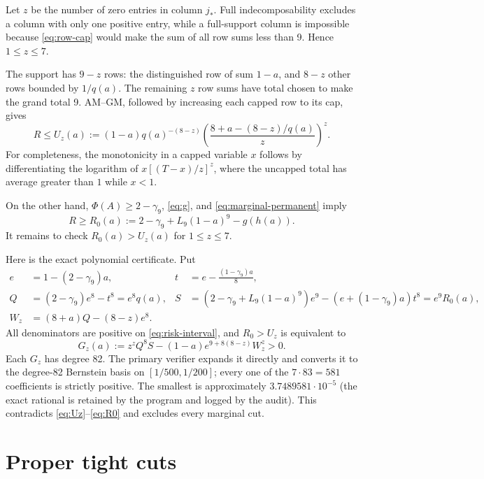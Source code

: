 \documentclass[11pt]{article}
\theoremstyle{remark}
\begin{document}
Let $z$ be the number of zero entries in column $j_*$.  Full
indecomposability excludes a column with only one positive entry, while a
full-support column is impossible because \eqref{eq:row-cap} would make the
sum of all row sums less than 9.  Hence $1\le z\le7$.

The support has $9-z$ rows: the distinguished row of sum $1-a$, and
$8-z$ other rows bounded by $1/q(a)$.  The remaining $z$ row sums have total
chosen to make the grand total 9.  AM--GM, followed by increasing each capped
row to its cap, gives
\begin{equation}\label{eq:Uz}
 R\le U_z(a):=(1-a)q(a)^{-(8-z)}
 \left(\frac{8+a-(8-z)/q(a)}{z}\right)^z.
\end{equation}
For completeness, the monotonicity in a capped variable $x$ follows by
differentiating the logarithm of
$x[(T-x)/z]^z$, where the uncapped total has average greater than $1$ while
$x<1$.

On the other hand, $\Phi(A)\ge2-\gamma_9$, \eqref{eq:g}, and
\eqref{eq:marginal-permanent} imply
\begin{equation}\label{eq:R0}
 R\ge R_0(a):=2-\gamma_9+L_9(1-a)^9-g(h(a)).
\end{equation}
It remains to check $R_0(a)>U_z(a)$ for $1\le z\le7$.

Here is the exact polynomial certificate.  Put
\begin{align*}
 e&=1-(2-\gamma_9)a,&
 t&=e-\frac{(1-\gamma_9)a}{8},\\
 Q&=(2-\gamma_9)e^8-t^8=e^8q(a),&
 S&=(2-\gamma_9+L_9(1-a)^9)e^9
     -(e+(1-\gamma_9)a)t^8=e^9R_0(a),\\
 W_z&=(8+a)Q-(8-z)e^8.
\end{align*}
All denominators are positive on \eqref{eq:risk-interval}, and
$R_0>U_z$ is equivalent to
\begin{equation}\label{eq:Gz}
 G_z(a):=z^zQ^8S
 -(1-a)e^{9+8(8-z)}W_z^z>0.
\end{equation}
Each $G_z$ has degree 82.  The primary verifier expands it directly and
converts it to the degree-82 Bernstein basis on $[1/500,1/200]$; every one of
the $7\cdot83=581$ coefficients is strictly positive.  The smallest is
approximately $3.7489581\cdot10^{-5}$ (the exact rational is retained by the
program and logged by the audit).  This contradicts
\eqref{eq:Uz}--\eqref{eq:R0} and excludes every marginal cut.

\section{Proper tight cuts}
\end{document}

